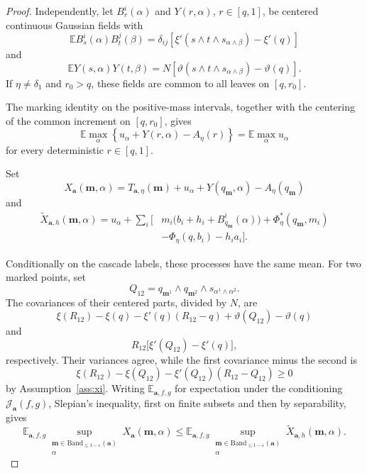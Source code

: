 \documentclass[a4paper,10pt,reqno]{amsart}
\numberwithin{equation}{section}
\newcommand{\ve}{\varepsilon}
\newcommand{\dE}{\mathbb{E}}%
\newcommand{\mc}{\mathcal}
\newcommand{\Band}{\mathrm{Band}}
\newcommand{\bfm}{\mathbf{m}}
\newcommand{\bfa}{\mathbf{a}}
\begin{document}
\begin{proof}
		Independently, let $B_r^i(\alpha)$ and $Y(r,\alpha)$,
		$r\in[q,1]$, be centered continuous Gaussian fields with
		\[
		\dE B_s^i(\alpha)B_t^j(\beta)
		=
		\delta_{ij}
		\left[
		\xi'(s\wedge t\wedge s_{\alpha\wedge\beta})
		-\xi'(q)
		\right]
		\]
		and
		\[
		\dE Y(s,\alpha)Y(t,\beta)
		=
		N\left[
		\vartheta(s\wedge t\wedge s_{\alpha\wedge\beta})
		-\vartheta(q)
		\right].
		\]
		If $\eta\ne\delta_1$ and $r_0>q$, these fields are common to all leaves on
		$[q,r_0]$.
		
		The marking identity on the positive-mass intervals, together
		with the centering of the common increment on $[q,r_0]$, gives
		\[
		\dE\max_\alpha
		\left\{
		u_\alpha+Y(r,\alpha)-A_\eta(r)
		\right\}
		=
		\dE\max_\alpha u_\alpha
		\]
		for every deterministic $r\in[q,1]$.
		
		Set
		\[
		X_{\bfa}(\bfm,\alpha)
		=
		T_{\bfa,\eta}(\bfm)
		+
		u_\alpha+Y(q_\bfm,\alpha)-A_\eta(q_\bfm)
		\]
		and
		\[
		\begin{aligned}
			\widetilde X_{\bfa,h}(\bfm,\alpha)
			=
			u_\alpha+\sum_i
			\bigl[
			&m_i\bigl(b_i+h_i+B_{q_\bfm}^i(\alpha)\bigr)
			+\Phi_\eta^*(q_\bfm,m_i)\\
			&-\Phi_\eta(q,b_i)-h_i a_i
			\bigr].
		\end{aligned}
		\]
		
		Conditionally on the cascade labels, these processes have the
		same mean. For two marked points, set
		\[
		Q_{12}
		=
		q_{\bfm^1}\wedge q_{\bfm^2}
		\wedge s_{\alpha^1\wedge\alpha^2}.
		\]
		The covariances of their centered parts, divided by $N$, are
		\[
		\xi(R_{12})-\xi(q)-\xi'(q)(R_{12}-q)
		+\vartheta(Q_{12})-\vartheta(q)
		\]
		and
		\[
		R_{12}\bigl[\xi'(Q_{12})-\xi'(q)\bigr],
		\]
		respectively. Their variances agree, while the first covariance
		minus the second is
		\[
		\xi(R_{12})-\xi(Q_{12})
		-\xi'(Q_{12})(R_{12}-Q_{12})\ge0
		\]
		by Assumption~\ref{ass:xi}. Writing \(\dE_{\bfa,f,g}\) for expectation
		under the conditioning $\mc J_\bfa(f,g)$, Slepian's inequality,
		first on finite subsets and then by separability, gives
		\[
		\dE_{\bfa,f,g}
		\sup_{\substack{
				\bfm\in\Band_{\le1-\ve}(\bfa)\\
				\alpha
		}}
		X_{\bfa}(\bfm,\alpha)
		\le
		\dE_{\bfa,f,g}
		\sup_{\substack{
				\bfm\in\Band_{\le1-\ve}(\bfa)\\
				\alpha
		}}
		\widetilde X_{\bfa,h}(\bfm,\alpha).
		\]
		

\end{proof}
\end{document}
